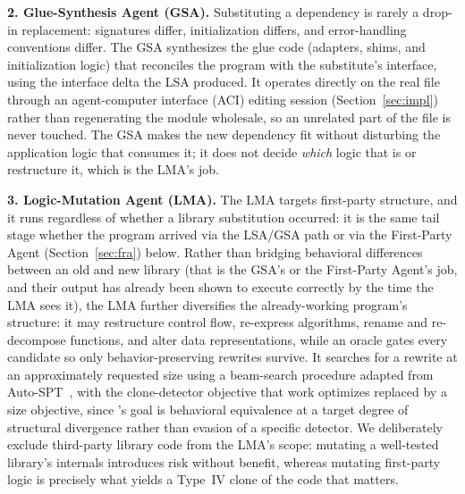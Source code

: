 \textbf{2. Glue-Synthesis Agent (GSA).} Substituting a dependency is rarely a drop-in replacement: signatures differ, initialization differs, and error-handling conventions differ. The GSA synthesizes the glue code (adapters, shims, and initialization logic) that reconciles the program with the substitute's interface, using the interface delta the LSA produced. It operates directly on the real file through an agent-computer interface (ACI) editing session (Section~\ref{sec:impl}) rather than regenerating the module wholesale, so an unrelated part of the file is never touched. The GSA makes the new dependency fit without disturbing the application logic that consumes it; it does not decide \emph{which} logic that is or restructure it, which is the LMA's job.

\textbf{3. Logic-Mutation Agent (LMA).} The LMA targets first-party structure, and it runs regardless of whether a library substitution occurred: it is the same tail stage whether the program arrived via the LSA/GSA path or via the First-Party Agent (Section~\ref{sec:fra}) below. Rather than bridging behavioral differences between an old and new library (that is the GSA's or the First-Party Agent's job, and their output has already been shown to execute correctly by the time the LMA sees it), the LMA further diversifies the already-working program's structure: it may restructure control flow, re-express algorithms, rename and re-decompose functions, and alter data representations, while an oracle gates every candidate so only behavior-preserving rewrites survive. It searches for a rewrite at an approximately requested size using a beam-search procedure adapted from Auto-SPT~\cite{hooda2025autospt}, with the clone-detector objective that work optimizes replaced by a size objective, since \sys's goal is behavioral equivalence at a target degree of structural divergence rather than evasion of a specific detector. We deliberately exclude third-party library code from the LMA's scope: mutating a well-tested library's internals introduces risk without benefit, whereas mutating first-party logic is precisely what yields a Type~IV clone of the code that matters.

